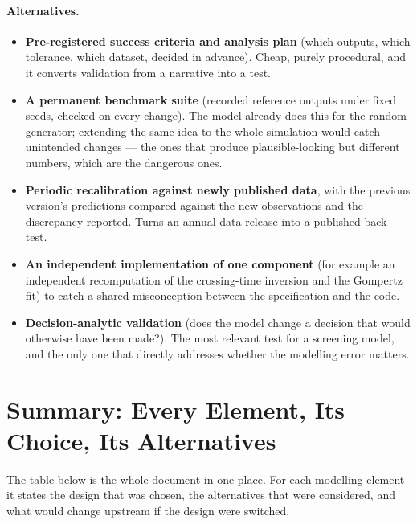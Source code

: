 \documentclass[12pt,a4paper]{article}
\newcommand{\alt}[1]{\paragraph{Alternatives.} #1}
\begin{document}
\alt{\begin{itemize}[nosep]
  \item \textbf{Pre-registered success criteria and analysis plan} (which outputs, which tolerance, which
        dataset, decided in advance). Cheap, purely procedural, and it converts validation from a narrative
        into a test.
  \item \textbf{A permanent benchmark suite} (recorded reference outputs under fixed seeds, checked on every
        change). The model already does this for the random generator; extending the same idea to the whole
        simulation would catch unintended changes --- the ones that produce plausible-looking but different
        numbers, which are the dangerous ones.
  \item \textbf{Periodic recalibration against newly published data}, with the previous version's
        predictions compared against the new observations and the discrepancy reported. Turns an annual data
        release into a published back-test.
  \item \textbf{An independent implementation of one component} (for example an independent recomputation of
        the crossing-time inversion and the Gompertz fit) to catch a shared misconception between the
        specification and the code.
  \item \textbf{Decision-analytic validation} (does the model change a decision that would otherwise have
        been made?). The most relevant test for a screening model, and the only one that directly addresses
        whether the modelling error matters.
\end{itemize}}

\section{Summary: Every Element, Its Choice, Its Alternatives}

The table below is the whole document in one place. For each modelling element it states the design that was
chosen, the alternatives that were considered, and what would change upstream if the design were switched.
\end{document}
